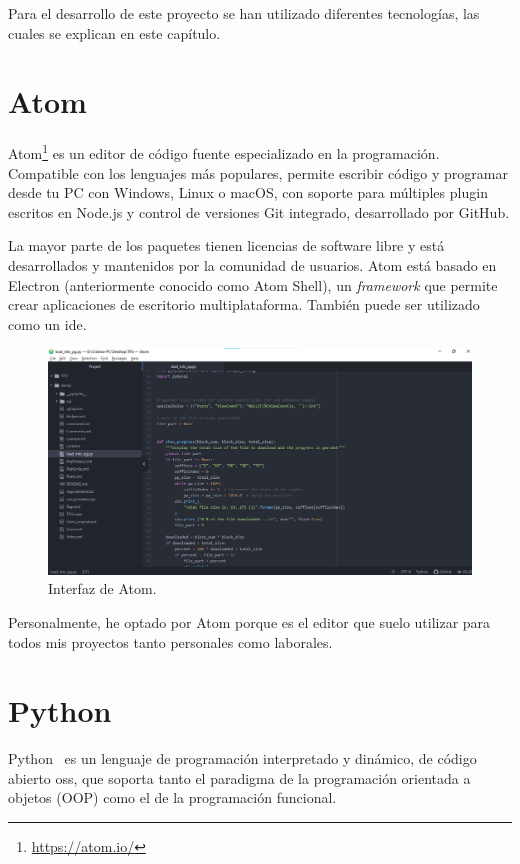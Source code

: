 \documentclass[a4paper, 12pt]{book}
\begin{document}
Para el desarrollo de este proyecto se han utilizado diferentes tecnologías, las cuales se explican en este capítulo.

\section{Atom} 
\label{sec:atom}
Atom\footnote{\url{https://atom.io/}} es un editor de código fuente especializado en la programación. Compatible con los lenguajes más populares, permite escribir código y programar desde tu PC con Windows, Linux o macOS, con soporte para múltiples \gls{plugin} escritos en Node.js y control de versiones Git integrado, desarrollado por GitHub. 

La mayor parte de los paquetes tienen licencias de software libre y está desarrollados y mantenidos por la comunidad de usuarios. Atom está basado en Electron (anteriormente conocido como Atom Shell), un \textit{framework} que permite crear aplicaciones de escritorio multiplataforma. También puede ser utilizado como un \gls{ide}.

\begin{figure}[ht]
        \centering
        \includegraphics[width=\textwidth]{img/ATOM.png}
        \caption{Interfaz de Atom.}
        \label{figura:ATOM}
    \end{figure}

Personalmente, he optado por Atom porque es el editor que suelo utilizar para todos
mis proyectos tanto personales como laborales. 

\section{Python} 
\label{sec:Python}

Python~\cite{van2007python} es un lenguaje de programación interpretado y dinámico, de código abierto \gls{oss}, que
soporta tanto el paradigma de la programación orientada a objetos (OOP) como el de la programación funcional.
\end{document}
